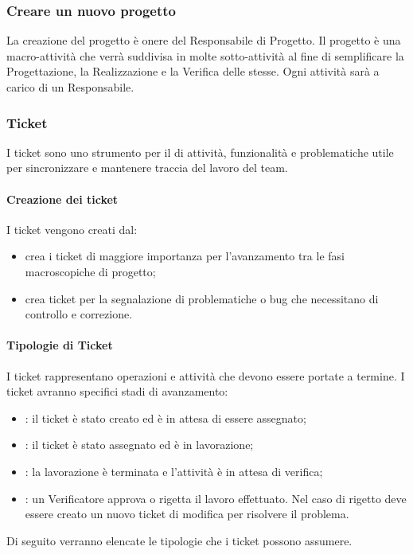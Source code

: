 \subsubsection{Creare un nuovo progetto}
\label{8.1}
La creazione del progetto è onere del Responsabile di Progetto.
Il progetto è una macro-attività che verrà suddivisa in molte sotto-attività al fine di semplificare la Progettazione, la Realizzazione e la Verifica delle stesse. Ogni attività sarà a carico di un Responsabile.

\subsubsection{Ticket}
\label{8.2}
I ticket sono uno strumento per il  di attività, funzionalità e problematiche utile per sincronizzare e mantenere traccia del lavoro del team.

\paragraph{Creazione dei ticket}
\label{8.3}
I ticket vengono creati dal:
\begin{itemize}
\item {} crea i ticket di maggiore importanza per l'avanzamento tra le fasi macroscopiche di progetto;
\item {} crea ticket per la segnalazione di problematiche o bug che necessitano di controllo e correzione.
\end{itemize}

\paragraph{Tipologie di Ticket}
\label{8.4}
I ticket rappresentano operazioni e attività che devono essere portate a termine.
I ticket avranno specifici stadi di avanzamento:
\begin{itemize}
\item {}: il ticket è stato creato ed è in attesa di essere assegnato;
\item {}: il ticket è stato assegnato ed è in lavorazione;
\item {}: la lavorazione è terminata e l'attività è in attesa di verifica;
\item {}: un Verificatore approva o rigetta il lavoro effettuato. Nel caso di rigetto deve essere creato un nuovo ticket di modifica per risolvere il problema.
\end{itemize}
Di seguito verranno elencate le tipologie che i ticket possono assumere.

